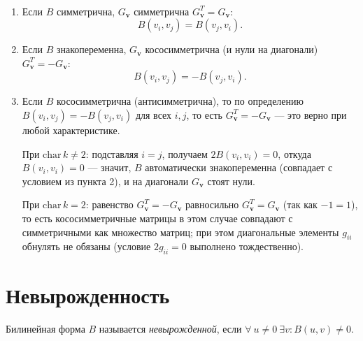 \begin{stmt}
    ~\begin{enumerate}
        \item Если $B$ симметрична, $G_{\mathbf{v}}$ симметрична $G_{\mathbf{v}}^T = G_{\mathbf{v}}$:
        \[ B(v_i, v_j) = B(v_j, v_i). \]
        \item Если $B$ знакопеременна, $G_{\mathbf{v}}$ кососимметрична (и нули на диагонали)
            $G_{\mathbf{v}}^T = -G_{\mathbf{v}}$: \[ B(v_i, v_j) = -B(v_j, v_i). \]
        \item Если $B$ кососимметрична (антисимметрична), то по определению
            $B(v_i,v_j) = -B(v_j,v_i)$ для всех $i,j$, то есть $G_{\mathbf{v}}^T = -G_{\mathbf{v}}$ ---
            это верно при любой характеристике.

            При $\mathrm{char}\, k \neq 2$: подставляя $i=j$, получаем $2B(v_i,v_i)=0$, откуда
            $B(v_i,v_i)=0$ --- значит, $B$ автоматически знакопеременна (совпадает с условием
            из пункта 2), и на диагонали $G_{\mathbf{v}}$ стоят нули.

            При $\mathrm{char}\, k = 2$: равенство $G_{\mathbf{v}}^T=-G_{\mathbf{v}}$ равносильно
            $G_{\mathbf{v}}^T=G_{\mathbf{v}}$ (так как $-1=1$), то есть кососимметричные матрицы
            в этом случае совпадают с симметричными как множество матриц; при этом диагональные
            элементы $g_{ii}$ обнулять не обязаны (условие $2g_{ii}=0$ выполнено тождественно).

    \end{enumerate}
\end{stmt}



\section{Невырожденность}

\begin{definition}
    Билинейная форма $B$ называется \emph{невырожденной}, если $\forall\ u \neq 0\ \exists v\colon B(u,v) \neq 0$.
\end{definition}



